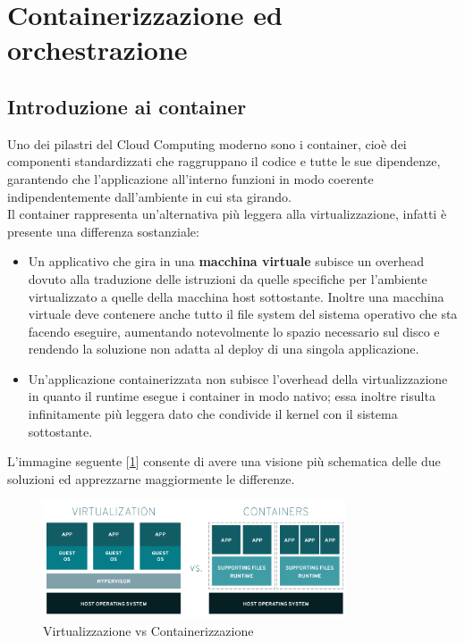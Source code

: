 \section{Containerizzazione ed orchestrazione}
\subsection{Introduzione ai container}

Uno dei pilastri del Cloud Computing moderno sono i container, cioè dei componenti standardizzati che raggruppano il codice e tutte le sue dipendenze, garantendo che l'applicazione all'interno funzioni in modo coerente indipendentemente dall'ambiente in cui sta girando.\\
Il container rappresenta un'alternativa più leggera alla virtualizzazione\cite{Felter2015An}, infatti è presente una differenza sostanziale:
\begin{itemize}
    \item Un applicativo che gira in una \textbf{macchina virtuale} subisce un overhead dovuto alla traduzione delle istruzioni da quelle specifiche per l'ambiente virtualizzato a quelle della macchina host sottostante. Inoltre una macchina virtuale deve contenere anche tutto il file system del sistema operativo che sta facendo eseguire, aumentando notevolmente lo spazio necessario sul disco e rendendo la soluzione non adatta al deploy di una singola applicazione.
    \item Un'applicazione containerizzata non subisce l'overhead della virtualizzazione in quanto il runtime esegue i container in modo nativo; essa inoltre risulta infinitamente più leggera dato che condivide il kernel con il sistema sottostante.
\end{itemize}

L'immagine seguente [\ref{fig:virtualization-vs-containers}] consente di avere una visione più schematica delle due soluzioni ed apprezzarne maggiormente le differenze.

\FloatBarrier
\begin{figure}[h]
    \centering
    \includegraphics[width=0.8\textwidth]{img/virtualization-vs-containers.png}
    \caption{Virtualizzazione vs Containerizzazione\protect\footnotemark}
    \label{fig:virtualization-vs-containers}
\end{figure}
\FloatBarrier
{}

